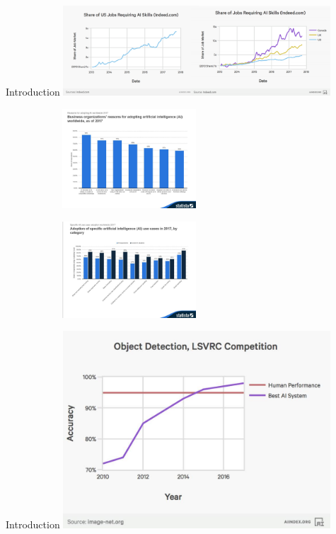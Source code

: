 \documentclass{beamer}
\begin{document}
\begin{frame}{Introduction}
\includegraphics[width=10cm]{figures/AI-Jobs-Composite-Graphic}
\begin{figure}
\centering
\begin{subfigure}{.5\textwidth}
  \centering
  \includegraphics[width=5cm]{figures/Reasons-for-adopting-AI-Worldwide}
\end{subfigure}%
\begin{subfigure}{.5\textwidth}
  \centering
  \includegraphics[width=5cm]{figures/Marketing-Centric-Adoption-Use-Cases-of-AI}
\end{subfigure}
\end{figure}
\end{frame}

\begin{frame}{Introduction}
\centering
\includegraphics[width=10cm]{figures/Large-Scale-Visual}
\end{frame}
\end{document}
